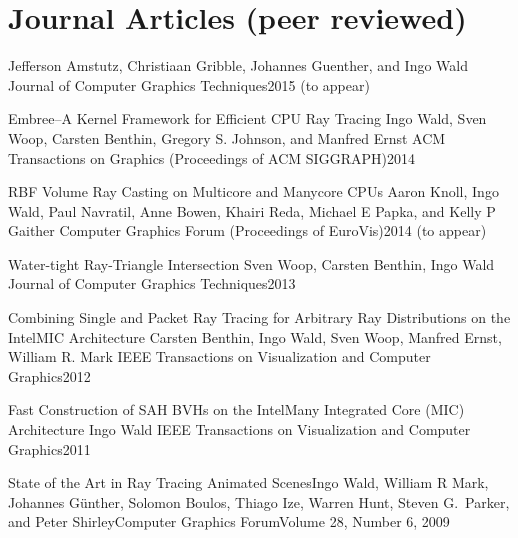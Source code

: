 \documentclass[letterpaper,11pt]{moderncv}
\begin{document}
\section{Journal Articles (peer reviewed)}

{Jefferson Amstutz, Christiaan Gribble, Johannes Guenther, and Ingo Wald}
{Journal of Computer Graphics Techniques}{2015 (to appear)}
  
  \cvbibitem 
    {Embree--A 
 Kernel Framework for Efficient CPU Ray Tracing}
    {Ingo Wald, Sven Woop, Carsten Benthin, Gregory S. Johnson, and Manfred Ernst}
    {ACM Transactions on Graphics (Proceedings of ACM SIGGRAPH)}{2014}

  \cvbibitem 
    {RBF Volume Ray Casting on Multicore and Manycore CPUs}
    {Aaron Knoll, Ingo Wald, Paul Navratil, Anne Bowen, Khairi Reda, Michael E Papka, and Kelly P Gaither}
    {Computer Graphics Forum (Proceedings of EuroVis)}{2014 (to appear)}

  \cvbibitem 
    {Water-tight Ray-Triangle Intersection}
    {Sven Woop, Carsten Benthin, Ingo Wald}
    {Journal of Computer Graphics Techniques}{2013}

  \cvbibitem 
    {Combining Single and Packet Ray Tracing for Arbitrary Ray Distributions on the Intel\textsuperscript\textcopyright MIC Architecture}
    {Carsten Benthin, Ingo Wald, Sven Woop, Manfred Ernst, William R. Mark}
    {IEEE Transactions on Visualization and Computer Graphics}{2012}

  \cvbibitem 
    {Fast Construction of SAH BVHs on the Intel\textsuperscript\textcopyright Many Integrated Core (MIC) Architecture}
    {Ingo Wald}
    {IEEE Transactions on Visualization and Computer Graphics}{2011}


  \cvbibitem 
    {State of the Art in Ray Tracing Animated Scenes}{Ingo Wald,
    William R Mark, Johannes G\"unther, Solomon Boulos, Thiago Ize,
    Warren Hunt, Steven G.\ Parker, and Peter Shirley}{Computer Graphics Forum}{Volume 28, Number 6, 2009}
\end{document}
